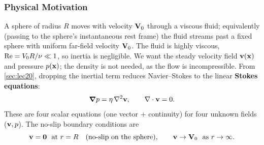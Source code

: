 \documentclass[../main.tex]{subfiles}
\begin{document}
\subsubsection*{Physical Motivation}
A sphere of radius $R$ moves with velocity $\mathbf{V}_0$ through a viscous fluid; equivalently (passing to the sphere's instantaneous rest frame) the fluid streams past a fixed sphere with uniform far-field velocity $\mathbf{V}_0$. The fluid is highly viscous, $\mathrm{Re}=V_0R/\nu\ll1$, so inertia is negligible. We want the steady velocity field $\mathbf{v}(\mathbf{x})$ and pressure $p(\mathbf{x})$; the density is not needed, as the flow is incompressible. From \cref{sec:lec20}, dropping the inertial term reduces Navier--Stokes to the linear \textbf{Stokes equations}:
\begin{equation}
  \grad p=\eta\,\nabla^2\mathbf{v},\qquad \nabla \cdot\mathbf{v}=0 .
  \label{eq:lec21_stokes}
\end{equation}
These are four scalar equations (one vector + continuity) for four unknown fields ($\mathbf{v},p$). The no-slip boundary conditions are
\begin{equation}
  \mathbf{v}=\mathbf{0} \ \ \text{at } r=R \quad(\text{no-slip on the sphere}),
  \qquad \mathbf{v}\to\mathbf{V}_0 \ \ \text{as } r\to\infty .
  \label{eq:lec21_bc}
\end{equation}
\end{document}
